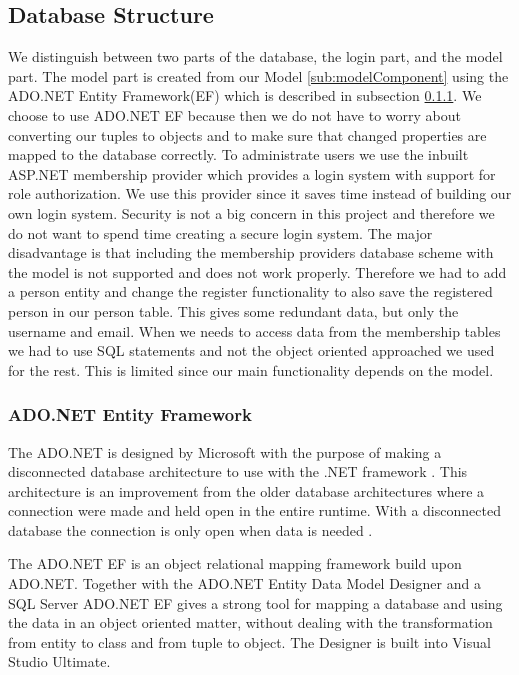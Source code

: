 \subsection{Database Structure}
\label{sec:databasestructure}

We distinguish between two parts of the database, the login part, and the model part. 
The model part is created from our Model \ref{sub:modelComponent} using the ADO.NET Entity Framework(EF) which is described in subsection \ref{sub:adonet}. 
We choose to use ADO.NET EF because then we do not have to worry about converting our tuples to objects and to make sure that changed properties are mapped to the database correctly.  
To administrate users we use the inbuilt ASP.NET membership provider which provides a login system with support for role authorization. 
We use this provider since it saves time instead of building our own login system. 
Security is not a big concern in this project and therefore we do not want to spend time creating a secure login system. 
The major disadvantage is that including the membership providers database scheme with the model is not supported and does not work properly. 
Therefore we had to add a person entity and change the register functionality to also save the registered person in our person table. 
This gives some redundant data, but only the username and email. 
When we needs to access data from the membership tables we had to use SQL statements and not the object oriented approached we used for the rest. 
This is limited since our main functionality depends on the model. 

\subsubsection{ADO.NET Entity Framework}
\label{sub:adonet}
The ADO.NET is designed by Microsoft with the purpose of making a disconnected database architecture to use with the .NET framework \cite{adonetDesignGoal}. 
This architecture is an improvement from the older database architectures where a connection were made and held open in the entire runtime. With a disconnected database the connection is only open when data is needed \cite{disconnectedData}. 

The ADO.NET EF is an object relational mapping framework \cite{adonetEntityFramework} build upon ADO.NET. 
Together with the ADO.NET Entity Data Model Designer and a SQL Server ADO.NET EF gives a strong tool for mapping a database and using the data in an object oriented matter, without dealing with the transformation from entity to class and from tuple to object. 
The Designer is built into Visual Studio Ultimate. 

